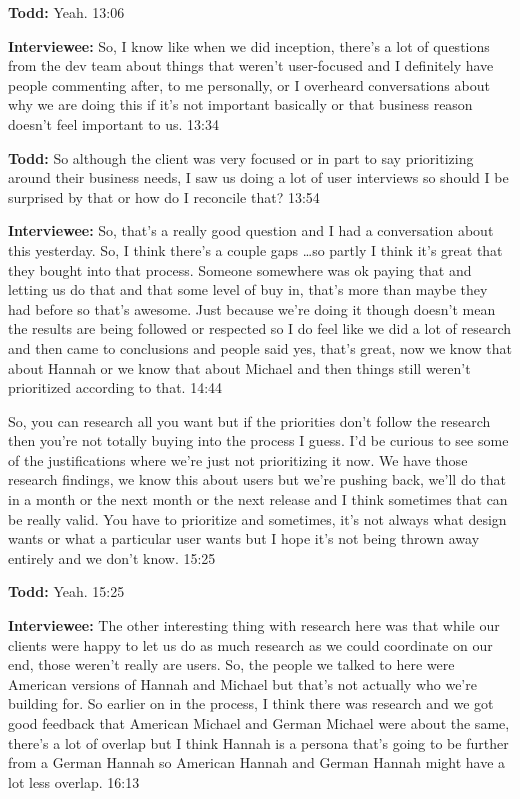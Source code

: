 \textbf{Todd:} Yeah.  13:06

\textbf{Interviewee:} So, I know like when we did inception, there's a lot of questions from the dev team about things that weren't user-focused and I definitely have people commenting after, to me personally, or I overheard conversations about why we are doing this if it's not important basically or that business reason doesn't feel important to us.  13:34

\textbf{Todd:} So although the client was very focused or in part to say prioritizing around their business needs, I saw us doing a lot of user interviews so should I be surprised by that or how do I reconcile that?  13:54

\textbf{Interviewee:} So, that's a really good question and I had a conversation about this yesterday.  So, I think there's a couple gaps \ldots so partly I think it's great that they bought into that process.  Someone somewhere was ok paying that and letting us do that and that some level of buy in, that's more than maybe they had before so that's awesome.  Just because we're doing it though doesn't mean the results are being followed or respected so I do feel like we did a lot of research and then came to conclusions and people said yes, that's great, now we know that about Hannah or we know that about Michael and then things still weren't prioritized according to that.  14:44

So, you can research all you want but if the priorities don't follow the research then you're not totally buying into the process I guess.  I'd be curious to see some of the justifications where we're just not prioritizing it now.  We have those research findings, we know this about users but we're pushing back, we'll do that in a month or the next month or the next release and I think sometimes that can be really valid.  You have to prioritize and sometimes, it's not always what design wants or what a particular user wants but I hope it's not being thrown away entirely and we don't know.  15:25

\textbf{Todd:} Yeah.  15:25

\textbf{Interviewee:} The other interesting thing with research here was that while our clients were happy to let us do as much research as we could coordinate on our end, those weren't really are users.  So, the people we talked to here were American versions of Hannah and Michael but that's not actually who we're building for.  So earlier on in the process, I think there was research and we got good feedback that American Michael and German Michael were about the same, there's a lot of overlap but I think Hannah is a persona that's going to be further from a German Hannah so American Hannah and German Hannah might have a lot less overlap.  16:13

